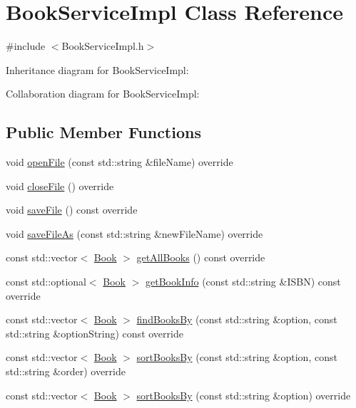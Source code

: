 \hypertarget{classBookServiceImpl}{}\section{Book\+Service\+Impl Class Reference}
\label{classBookServiceImpl}


{\ttfamily \#include $<$Book\+Service\+Impl.\+h$>$}



Inheritance diagram for Book\+Service\+Impl\+:


Collaboration diagram for Book\+Service\+Impl\+:
\subsection*{Public Member Functions}
\begin{DoxyCompactItemize}
\item 
void \hyperlink{classBookServiceImpl_ab95aca2128c3abe9826a54ba4efff14b}{open\+File} (const std\+::string \&file\+Name) override
\item 
void \hyperlink{classBookServiceImpl_abf8207579fffae1a2bd1003b8684d994}{close\+File} () override
\item 
void \hyperlink{classBookServiceImpl_af6b0c5e77b20b1baf2e7be7630fb56b8}{save\+File} () const override
\item 
void \hyperlink{classBookServiceImpl_a8d7fa1e7a5f64a7716422bd18e79c35f}{save\+File\+As} (const std\+::string \&new\+File\+Name) override
\item 
const std\+::vector$<$ \hyperlink{classBook}{Book} $>$ \hyperlink{classBookServiceImpl_a7ef55efcff6a50977de2a97ce156838f}{get\+All\+Books} () const override
\item 
const std\+::optional$<$ \hyperlink{classBook}{Book} $>$ \hyperlink{classBookServiceImpl_adaf138469f4de2806de2a16aa92b288a}{get\+Book\+Info} (const std\+::string \&I\+S\+BN) const override
\item 
const std\+::vector$<$ \hyperlink{classBook}{Book} $>$ \hyperlink{classBookServiceImpl_a650bd2918bbacfd628e1d399a1c82b48}{find\+Books\+By} (const std\+::string \&option, const std\+::string \&option\+String) const override
\item 
const std\+::vector$<$ \hyperlink{classBook}{Book} $>$ \hyperlink{classBookServiceImpl_a597b769829c06f73168e08b900571cc5}{sort\+Books\+By} (const std\+::string \&option, const std\+::string \&order) override
\item 
const std\+::vector$<$ \hyperlink{classBook}{Book} $>$ \hyperlink{classBookServiceImpl_a95290c709cbb9fa56e3e2ca2753096d8}{sort\+Books\+By} (const std\+::string \&option) override

\end{DoxyCompactItemize}
